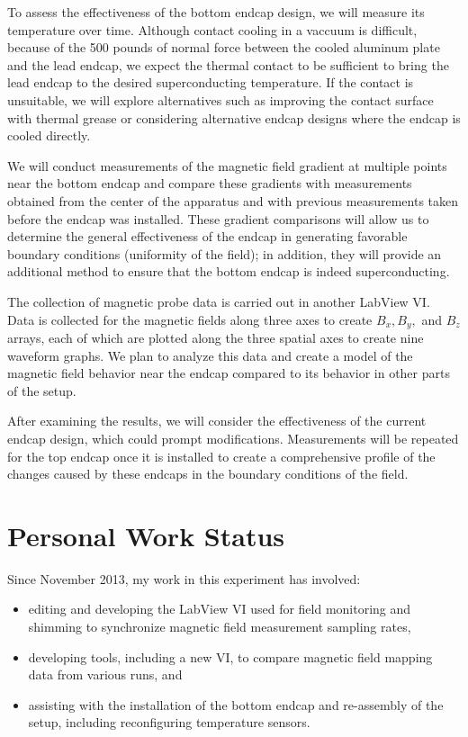 \documentclass[twocolumn,aps,prb,citeautoscript]{revtex4-1}
\begin{document}
To assess the effectiveness of the bottom endcap design, we will
measure its temperature over time. Although contact cooling in a vaccuum
is difficult, because of the 500 pounds of normal force between the
cooled aluminum plate and the lead endcap, we expect the thermal contact to be
sufficient to bring the lead endcap to the desired superconducting
temperature. If the contact is unsuitable, we will explore alternatives such as
improving the contact surface with thermal grease or considering alternative
endcap designs where the endcap is cooled directly. 

We will conduct measurements of the magnetic field gradient
at multiple points near the bottom endcap and compare these
gradients with measurements obtained from the center of the apparatus
and with previous measurements taken before the endcap was installed. These
gradient comparisons will allow us to determine the general effectiveness of
the endcap in generating favorable boundary conditions (uniformity of the
field); in addition, they will provide an additional method to ensure that the
bottom endcap is indeed superconducting.

The collection of magnetic probe data
is carried out in another LabView VI. Data is collected
for the magnetic fields along three axes to create $B_x, B_y,$ and $B_z$
arrays, each of which are plotted along the three spatial axes to create nine
waveform graphs. We plan to analyze this data and create a model of the
magnetic field behavior near the endcap compared to its behavior in other parts
of the setup.

After examining the results, we will consider the effectiveness of the current
endcap design, which could prompt modifications. Measurements
will be repeated for the top endcap once it is installed
to create a comprehensive profile of
the changes caused by these endcaps in the boundary conditions of the field.

\section{Personal Work Status}

Since November 2013, my work in this experiment has involved:
\begin{itemize}
\item editing and developing the LabView VI used for field monitoring and
shimming to synchronize magnetic field measurement sampling rates,
\item developing tools, including a new VI, to compare magnetic field mapping
data from various runs, and
\item assisting with the installation of the bottom endcap and re-assembly
of the setup, including reconfiguring temperature sensors.
\end{itemize}
\end{document}
